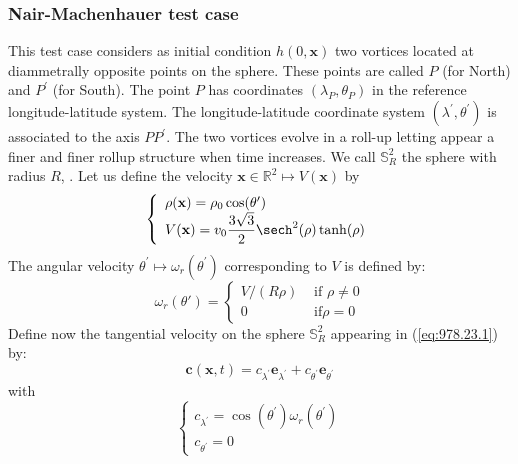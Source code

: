 \subsubsection{Nair-Machenhauer test case}

\label{sec:4.1}
This test case \cite{Nair-Machenhauer}
considers
as initial condition $h(0,\mathbf{x})$
two vortices located
at diammetrally opposite points on the sphere.
These points are called $P$ (for North) and $P^\prime$ (for South).
The point $P$ has coordinates $(\lambda_P,\theta_P)$ in the reference
longitude-latitude system.
The longitude-latitude coordinate system 
$(\lambda^\prime,\theta^\prime)$ is associated to 
the axis $P  P^\prime$. The two vortices evolve in a roll-up
letting appear a finer and finer rollup structure when time increases.
We call $\mathbb{S}^2_R$ the sphere with radius $R$, 
\cite{Nair-Cote-Stanisforth,Nair-Machenhauer}.
Let us define the velocity $\mathbf{x} \in \mathbb{R}^2 \mapsto V(\mathbf{x})$ 
by
\begin{equation}
\left\{
\begin{array}{l}
\rho(\mathbf{x})=\rho_0 \cos(\theta^\prime)\\
V(\mathbf{x}) = v_0 \dfrac{3 \sqrt{3} }{2} \sech^2 ( \rho ) \tanh ( \rho )
\end{array}
\right.
\end{equation} 
The angular velocity $\theta^\prime \mapsto \omega_r(\theta^\prime)$ 
corresponding to $V$ 
is defined by:
\begin{equation}
   \omega_r ( \theta' ) = \left\{ 
   \begin{array}{ll}
      V/( R \rho ) & \text{ if } \rho \neq 0 \\
      0 & \text{ if} \rho =0
   \end{array}
   \right.
\label{vitesse_angulaire}
\end{equation}
Define now the tangential velocity on the sphere $\mathbb{S}^2_R$ 
appearing in (\ref{eq:978.23.1}) by:
\begin{equation}
\mathbf{c}(\mathbf{x},t)=c_{\lambda^\prime} \mathbf{e}_{\lambda^\prime}+
c_{\theta^\prime} \mathbf{e}_{\theta^\prime}
\end{equation}
with
\begin{equation}
\left\{
\begin{array}{l}
c_{\lambda^\prime}=\cos(\theta^\prime) \omega_r(\theta^\prime)\\
c_{\theta^\prime}=0
\end{array}
\right.
\end{equation}

